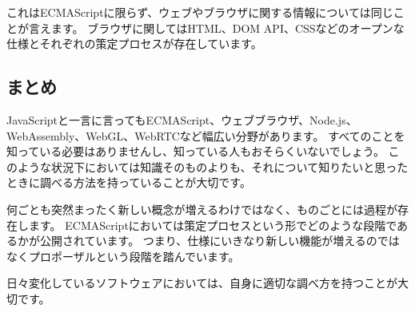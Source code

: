 これはECMAScriptに限らず、ウェブやブラウザに関する情報については同じことが言えます。
ブラウザに関してはHTML、DOM
API、CSSなどのオープンな仕様とそれぞれの策定プロセスが存在しています。

\hypertarget{ecmascript-summary}{%
\subsection{まとめ}\label{ecmascript-summary}}

JavaScriptと一言に言ってもECMAScript、ウェブブラウザ、Node.js、WebAssembly、WebGL、WebRTCなど幅広い分野があります。
すべてのことを知っている必要はありませんし、知っている人もおそらくいないでしょう。
このような状況下においては知識そのものよりも、それについて知りたいと思ったときに調べる方法を持っていることが大切です。

何ごとも突然まったく新しい概念が増えるわけではなく、ものごとには過程が存在します。
ECMAScriptにおいては策定プロセスという形でどのような段階であるかが公開されています。
つまり、仕様にいきなり新しい機能が増えるのではなくプロポーザルという段階を踏んでいます。

日々変化しているソフトウェアにおいては、自身に適切な調べ方を持つことが大切です。
